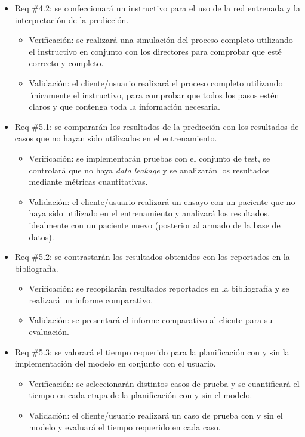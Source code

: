 \documentclass[
11pt, %
codirector, %
]{charter}
\begin{document}
\begin{itemize}
\item Req \#4.2: se confeccionará un instructivo para el uso de la red entrenada y la interpretación de la predicción.

\begin{itemize}
	\item Verificación: se realizará una simulación del proceso completo utilizando el instructivo en conjunto con los directores para comprobar que esté correcto y completo.
	\item Validación: el cliente/usuario realizará el proceso completo utilizando únicamente el instructivo, para comprobar que todos los pasos estén claros y que contenga toda la información necesaria.  
\end{itemize}

\item Req \#5.1: se compararán los resultados de la predicción con los resultados de casos que no hayan sido utilizados en el entrenamiento.

\begin{itemize}
	\item Verificación: se implementarán pruebas con el conjunto de test, se controlará que no haya \textit{data leakage} y se analizarán los resultados mediante métricas cuantitativas.
	\item Validación: el cliente/usuario realizará un ensayo con un paciente que no haya sido utilizado en el entrenamiento y analizará los resultados, idealmente con un paciente nuevo (posterior al armado de la base de datos).
\end{itemize}

\item Req \#5.2: se contrastarán los resultados obtenidos con los reportados en la bibliografía.

\begin{itemize}
	\item Verificación: se recopilarán resultados reportados en la bibliografía y se realizará un informe comparativo.
	\item Validación: se presentará el informe comparativo al cliente para su evaluación.  
\end{itemize}

\item Req \#5.3: se valorará el tiempo requerido para la planificación con y sin la implementación del modelo en conjunto con el usuario.

\begin{itemize}
	\item Verificación: se seleccionarán distintos casos de prueba y se cuantificará el tiempo en cada etapa de la planificación con y sin el modelo.
	\item Validación: el cliente/usuario realizará un caso de prueba con y sin el modelo y evaluará el tiempo requerido en cada caso.  
\end{itemize}
\end{itemize}
\end{document}
